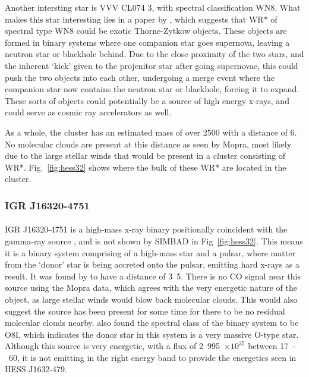 \documentclass[a4paper, titlepage, oneside]{article}
\newcommand{\e}[1]{\ensuremath{\times 10^{#1}}}
\newcommand{\smass}{\mathrm{M_\odot}}
\newcommand{\parsec}{\mathrm{pc}}
\newcommand{\erg}{\mathrm{erg}}
\begin{document}
\begin{multicols}{2}
Another intersting star is VVV CL074 3, with spectral classification WN8. What makes this star interesting lies in a paper by \textcite{Foellmi:2002}, which suggests that WR* of spectral type WN8 could be exotic Thorne-Zytkow objects. These objects are formed in binary systems where one companion star goes supernova, leaving a neutron star or blackhole behind. Due to the close proximity of the two stars, and the inherent `kick' given to the projenitor star after going supernovae, this could push the two objects into each other, undergoing a merge event where the companion star now contains the neutron star or blackhole, forcing it to expand. These sorts of objects could potentially be a source of high energy x-rays, and could serve as cosmic ray accelerators as well.

As a whole, the cluster has an estimated mass of over \unit{2500}{\smass} with a distance of \unit{6}{\kilo\parsec}. No molecular clouds are present at this distance as seen by Mopra, most likely due to the large stellar winds that would be present in a cluster consisting of WR*. Fig.~\ref{fig:hess32} shows where the bulk of these WR* are located in the cluster.

\subsubsection{IGR J16320-4751}
\paragraph{}
IGR J16320-4751 is a high-mass x-ray binary positionally coincident with the gamma-ray source \parencite{Aharonian:2006}, and is not shown by SIMBAD in Fig~\ref{fig:hess32}. This means it is a binary system comprising of a high-mass star and a pulsar, where matter from the `donor' star is being accreted onto the pulsar, emitting hard x-rays as a result. It was found by \textcite{Lutovinov:2013} to have a distance of \unit{3.5}{\kilo\parsec}. There is no CO signal near this source using the Mopra data, which agrees with the very energetic nature of the object, as large stellar winds would blow back molecular clouds. This would also suggest the source has been present for some time for there to be no residual molecular clouds nearby. \textcite{Lutovinov:2013} also found the spectral class of the binary system to be O8I, which indicates the donor star in this system is a very massive O-type star. Although this source is very energetic, with a flux of \unit{2.995\e{35}}{\erg\usk\reciprocal\second} between \unit{17-60}{\kilo\electronvolt}, it is not emitting in the right energy band to provide the energetics seen in HESS J1632-479.


\end{multicols}
\end{document}
